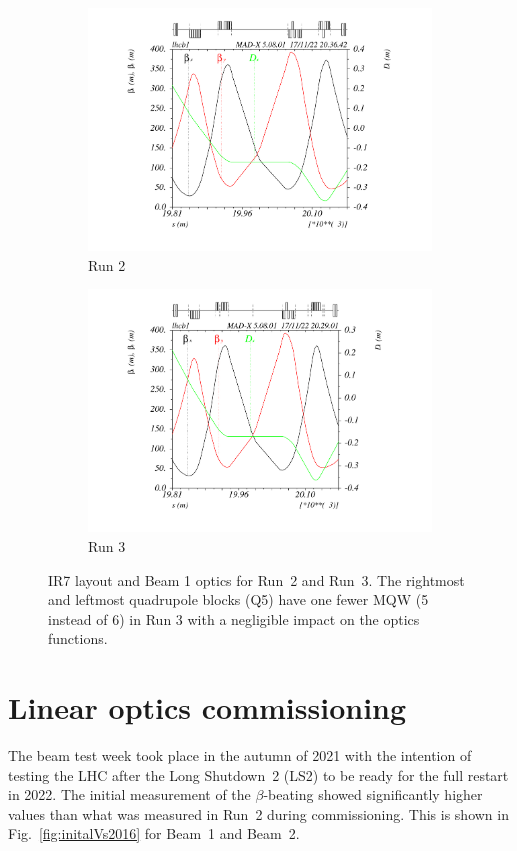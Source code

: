 \documentclass[a4paper]{cernatsnote}
\begin{document}
\begin{figure}
\begin{subfigure}{1.\textwidth}
  \centering
  \includegraphics[width=0.76\linewidth, trim=85 45 70 15, clip]{plots/beam1/IR7_Run2.pdf}  
  \caption{Run 2}
\end{subfigure}
\begin{subfigure}{1.\textwidth}
  \centering
  \includegraphics[width=.83\linewidth, trim=65 45 70 15, clip]{plots/beam1/IR7_Run3.pdf}  
  \caption{Run 3}
\end{subfigure}
\caption{IR7 layout and Beam 1 optics for Run~2 and Run~3. The rightmost and leftmost quadrupole blocks (Q5) have one fewer MQW (5 instead of 6) in Run 3 with a negligible impact on the optics functions.}
\label{fig:IR7}
\end{figure}


\section{Linear optics commissioning}
The beam test week took place in the autumn of 2021 with the intention of testing the LHC after the Long Shutdown~2 (LS2) to be ready for the full restart in 2022.
The initial measurement of the $\beta$-beating showed significantly higher values than what was measured in Run~2 during commissioning. This is shown in Fig.~\ref{fig:initalVs2016} for Beam~1 and Beam~2.  
\end{document}
